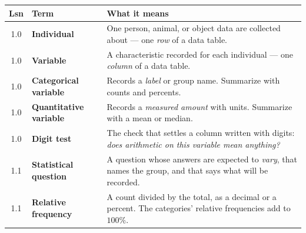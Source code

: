 \documentclass[10pt]{article}
\begin{document}
\vspace{3pt}
\renewcommand{\arraystretch}{1.22}
\boxguard[14]
\begin{tabularx}{\linewidth}{@{} c >{\raggedright\arraybackslash\bfseries}p{3.5cm} X @{}}
\rowcolor{frost}
\textbf{Lsn} & \textbf{Term} & \textbf{What it means} \\
\midrule
1.0 & Individual & One person, animal, or object data are collected about --- one
      \emph{row} of a data table. \\
1.0 & Variable & A characteristic recorded for each individual --- one
      \emph{column} of a data table. \\
1.0 & Categorical variable & Records a \emph{label} or group name. Summarize with
      counts and percents. \\
1.0 & Quantitative variable & Records a \emph{measured amount} with units.
      Summarize with a mean or median. \\
1.0 & Digit test & The check that settles a column written with digits:
      \emph{does arithmetic on this variable mean anything?} \\
1.1 & Statistical question & A question whose answers are expected to
      \emph{vary}, that names the group, and that says what will be recorded. \\
1.1 & Relative frequency & A count divided by the total, as a decimal or a
      percent. The categories' relative frequencies add to $100\%$. \\
\end{tabularx}
\end{document}
